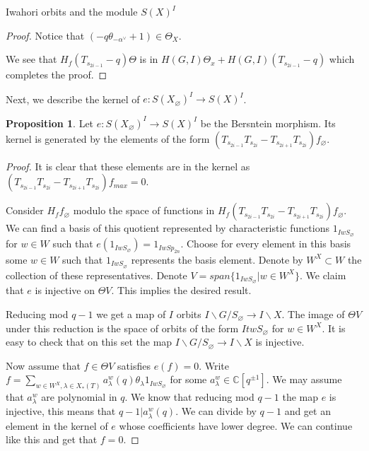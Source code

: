 \documentclass[12pt]{article}
\newcommand{\C}{\mathbb{C}}
\newcommand{\<}{\langle}
\renewcommand{\>}{\rangle}
\renewcommand{\emptyset}{\varnothing}
\theoremstyle{plain}
\theoremstyle{definition}
\newtheorem{prop}[theorem]{Proposition}
\begin{document}
\begin{section}{Iwahori orbits and the module $S(X)^I$}
\begin{proof}
        Notice that $(-q\theta_{-\alpha^\vee}+1)\in \Theta_X$.
        
        We see that $H_f(T_{s_{2i-1}}-q)\Theta$ is in $H(G,I)\Theta_x+H(G,I)(T_{s_{2i-1}}-q)$ which completes the proof.
        
    \end{proof}

    Next, we describe the kernel of $e:S(X_\emptyset)^I\rightarrow S(X)^I$.

    \begin{prop}
        Let $e:S(X_\emptyset)^I\rightarrow S(X)^I$ be the Bersntein morphism. Its kernel is generated by the elements of the form $(T_{s_{2i-1}}T_{s_{2i}}-T_{s_{2i+1}}T_{s_{2i}})f_\emptyset$. 
    \end{prop}

    \begin{proof}
        It is clear that these elements are in the kernel as $(T_{s_{2i-1}}T_{s_{2i}}-T_{s_{2i+1}}T_{s_{2i}})f_{max}=0$.

        Consider $H_ff_\emptyset$ modulo the space of functions in $H_f(T_{s_{2i-1}}T_{s_{2i}}-T_{s_{2i+1}}T_{s_{2i}})f_\emptyset$. We can find a basis of this quotient represented by characteristic functions $1_{IwS_\emptyset}$ for $w\in W$ such that $e(1_{IwS_\emptyset})=1_{IwSp_{2n}}$. Choose for every element in this basis some $w\in W$ such that $1_{IwS_\emptyset}$ represents the basis element. Denote by $W^X\subset W$ the collection of these representatives. Denote $V=span\{1_{IwS_\emptyset}|w\in W^X\}$. We claim that $e$ is injective on $\Theta V$. This implies the desired result.

        Reducing mod $q-1$ we get a map of $I$ orbits $I\backslash G/S_\emptyset\rightarrow I\backslash X$. The image of $\Theta V$ under this reduction is the space of orbits of the form $ItwS_\emptyset$ for $w\in W^X$. It is easy to check that on this set the map $I\backslash G/S_\emptyset\rightarrow I\backslash X$ is injective.

        Now assume that $f\in \Theta V$ satisfies $e(f)=0$. Write $f=\sum_{w\in W^X,\lambda\in X_*(T)} a_\lambda^w(q)\theta_\lambda1_{IwS_\emptyset}$ for some $a_\lambda^w\in \C[q^{\pm 1}]$. We may assume that $a_\lambda^w$ are polynomial in $q$. We know that reducing mod $q-1$ the map $e$ is injective, this means that $q-1|a_\lambda^w(q)$. We can divide by $q-1$ and get an element in the kernel of $e$ whose coefficients have lower degree. We can continue like this and get that $f=0$. 
    \end{proof}


\end{section}
\end{document}
